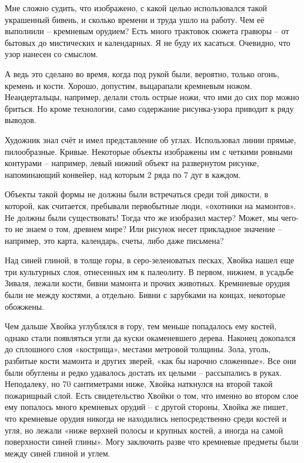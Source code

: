 \newpage

Мне сложно судить, что изображено, с какой целью использовался такой украшенный бивень, и сколько времени и труда ушло на работу. Чем её выполнили – кремневым орудием? Есть много трактовок сюжета гравюры – от бытовых до мистических и календарных. Я не буду их касаться. Очевидно, что узор нанесен со смыслом.

А ведь это сделано во время, когда под рукой были, вероятно, только огонь, кремень и кости. Хорошо, допустим, выцарапали кремневым ножом. Неандертальцы, например, делали столь острые ножи, что ими до сих пор можно бриться. Но кроме технологии, само содержание рисунка-узора приводит к ряду выводов.

Художник знал счёт и имел представление об углах. Использовал линии прямые, пилообразные. Кривые. Некоторые объекты изображены им с четкими ровными контурами – например, левый нижний объект на развернутом рисунке, напоминающий конвейер, над которым 2 ряда по 7 дуг в каждом.

Объекты такой формы не должны были встречаться среди той дикости, в которой, как считается, пребывали первобытные люди, «охотники на мамонтов». Не должны были существовать! Тогда что же изобразил мастер? Может, мы чего-то не знаем о том, древнем мире? Или рисунок несет прикладное значение – например, это карта, календарь, счеты, либо даже письмена?

Над синей глиной, в толще горы, в серо-зеленоватых песках, Хвойка нашел еще три культурных слоя, отнесенных им к палеолиту. В первом, нижнем, в усадьбе Зиваля, лежали кости, бивни мамонта и прочих животных. Кремниевые орудия были не между костями, а отдельно. Бивни с зарубками на концах, некоторые обожжены.

Чем дальше Хвойка углублялся в гору, тем меньше попадалось ему костей, однако стали появляться угли да куски окаменевшего дерева. Наконец докопался до сплошного слоя «кострища», местами метровой толщины. Зола, уголь, разбитые кости мамонта и других зверей, «как бы нарочно сложенные». Все они были обуглены и редко удавалось достать их целыми – рассыпались в руках. Неподалеку, но 70 сантиметрами ниже, Хвойка наткнулся на второй такой пожарищный слой. Есть свидетельство Хвойки о том, что именно во втором слое ему попалось много кремневых орудий – с другой стороны, Хвойка же пишет, что кремневые орудия никогда не находились непосредственно среди костей и угля, но лежали «ниже верхней полосы и крупных костей, а иногда на самой поверхности синей глины». Могу заключить разве что кремневые предметы были между синей глиной и углем.

